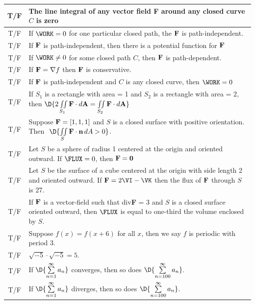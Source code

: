 \documentclass[12pt]{amsart}
\numberwithin{equation}{section}
\begin{document}
	\setlength{\extrarowheight}{0.5cm}
	\begin{tabular}{| c | p{17.2cm} |}
		\hline
		T\quad/\quad F & The line integral of any vector field {\bf F} around any closed curve $C$ is zero\\
		\hline
		T\quad/\quad F & If $\WORK = 0$ for one particular closed path, the ${\bf F}$ is path-independent.\\
		\hline
		T\quad/\quad F & If ${\bf F}$ is path-independent, then there is a potential function for ${\bf F}$\\
		\hline
		T\quad/\quad F & If $\WORK \ne 0$ for some closed path $C$, then ${\bf F}$ is path-dependent.\\
		\hline
		T\quad/\quad F & If ${\bf F} = \nabla f$ then ${\bf F}$ is conservative.\\
		\hline
		T\quad/\quad F & If ${\bf F}$ is path-independent and $C$ is any closed curve, then $\WORK = 0$\\
		\hline
		T\quad/\quad F & If $S_1$ is a rectangle with area = 1 and $S_2$ is a rectangle with area = 2, then
$\D{2\iint \limits_{S_1} {\bf F} \cdot d{\bf A} = \iint \limits_{S_2} {\bf F} \cdot d{\bf A}}$\\
		\hline
		T\quad/\quad F & Suppose $\text{\text{\bf F}} = [1,1,1]$ and $S$ is a closed surface with positive orientation.  Then \,\,$\D{\iint \limits_{S} \text{\bf F}\cdot \text{\bf n} \, dA > 0}$.\\
		\hline
		T\quad/\quad F & Let $S$ be a sphere of radius 1 centered at the origin and oriented outward.  If $\FLUX = 0$, then ${\bf F} = {\bf 0}$\\
		\hline
		T\quad/\quad F & Let $S$ be the surface of a cube centered at the origin with side length 2 and oriented outward.  If ${\bf F} = 2\VI - \VK$ then the flux of ${\bf F}$ through $S$ is 27.\\
		\hline
		T\quad/\quad F & If ${\bf F}$ is a vector-field such that div{\bf F} = 3 and $S$ is a closed surface oriented outward, then $\FLUX$ is equal to one-third the volume enclosed by $S$.\\
		\hline
		T\quad/\quad F & Suppose $f(x) = f(x+6)$ for all $x$, then we say $f$ is periodic with period 3.\\
		\hline
		T\quad/\quad F & $\sqrt{-5}\cdot\sqrt{-5} = 5$.\\
		\hline
		T\quad/\quad F & If $\D{\sum \limits_{n=1}^{\infty} a_n}$ converges, then so does $\D{\sum \limits_{n=100}^{\infty} a_n}$.\\
		\hline
		T\quad/\quad F & If $\D{\sum \limits_{n=1}^{\infty} a_n}$ diverges, then so does $\D{\sum \limits_{n=100}^{\infty} a_n}$.\\

\end{tabular}
\end{document}
